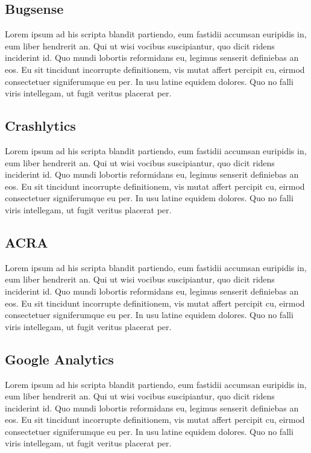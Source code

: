 \subsection{Bugsense}
Lorem ipsum ad his scripta blandit partiendo, eum fastidii accumsan euripidis in, eum liber hendrerit an. Qui ut wisi vocibus suscipiantur, quo dicit ridens inciderint id. Quo mundi lobortis reformidans eu, legimus senserit definiebas an eos. Eu sit tincidunt incorrupte definitionem, vis mutat affert percipit cu, eirmod consectetuer signiferumque eu per. In usu latine equidem dolores. Quo no falli viris intellegam, ut fugit veritus placerat per.

\subsection{Crashlytics}
Lorem ipsum ad his scripta blandit partiendo, eum fastidii accumsan euripidis in, eum liber hendrerit an. Qui ut wisi vocibus suscipiantur, quo dicit ridens inciderint id. Quo mundi lobortis reformidans eu, legimus senserit definiebas an eos. Eu sit tincidunt incorrupte definitionem, vis mutat affert percipit cu, eirmod consectetuer signiferumque eu per. In usu latine equidem dolores. Quo no falli viris intellegam, ut fugit veritus placerat per.

\subsection{ACRA}
Lorem ipsum ad his scripta blandit partiendo, eum fastidii accumsan euripidis in, eum liber hendrerit an. Qui ut wisi vocibus suscipiantur, quo dicit ridens inciderint id. Quo mundi lobortis reformidans eu, legimus senserit definiebas an eos. Eu sit tincidunt incorrupte definitionem, vis mutat affert percipit cu, eirmod consectetuer signiferumque eu per. In usu latine equidem dolores. Quo no falli viris intellegam, ut fugit veritus placerat per.

\subsection{Google Analytics}
Lorem ipsum ad his scripta blandit partiendo, eum fastidii accumsan euripidis in, eum liber hendrerit an. Qui ut wisi vocibus suscipiantur, quo dicit ridens inciderint id. Quo mundi lobortis reformidans eu, legimus senserit definiebas an eos. Eu sit tincidunt incorrupte definitionem, vis mutat affert percipit cu, eirmod consectetuer signiferumque eu per. In usu latine equidem dolores. Quo no falli viris intellegam, ut fugit veritus placerat per.

